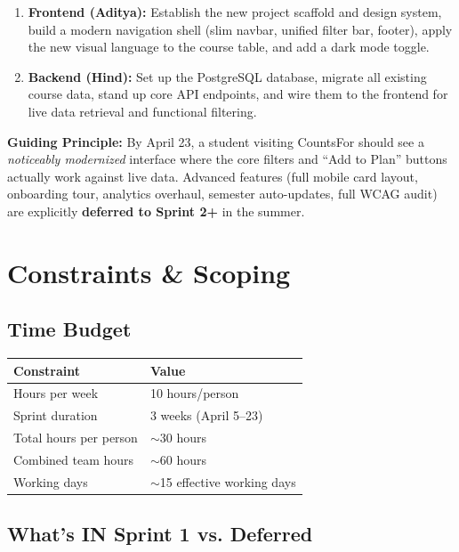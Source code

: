 \documentclass[11pt]{article}
\begin{document}
\begin{enumerate}[label=\textbf{\arabic*.}]
    \item \textbf{Frontend (Aditya):} Establish the new project scaffold and design system, build a modern navigation shell (slim navbar, unified filter bar, footer), apply the new visual language to the course table, and add a dark mode toggle.
    \item \textbf{Backend (Hind):} Set up the PostgreSQL database, migrate all existing course data, stand up core API endpoints, and wire them to the frontend for live data retrieval and functional filtering.
\end{enumerate}

\noindent
\textbf{Guiding Principle:} By April 23, a student visiting CountsFor should see a \textit{noticeably modernized} interface where the core filters and ``Add to Plan'' buttons actually work against live data. Advanced features (full mobile card layout, onboarding tour, analytics overhaul, semester auto-updates, full WCAG audit) are explicitly \textbf{deferred to Sprint 2+} in the summer.

\section{Constraints \& Scoping}

\subsection{Time Budget}

\begin{tabular}{p{} p{}}
\toprule
\textbf{Constraint} & \textbf{Value} \\
\midrule
Hours per week & 10 hours/person \\
Sprint duration & 3 weeks (April 5--23) \\
Total hours per person & $\sim$30 hours \\
Combined team hours & $\sim$60 hours \\
Working days & $\sim$15 effective working days \\
\bottomrule
\end{tabular}

\subsection{What's IN Sprint 1 vs. Deferred}
\end{document}
